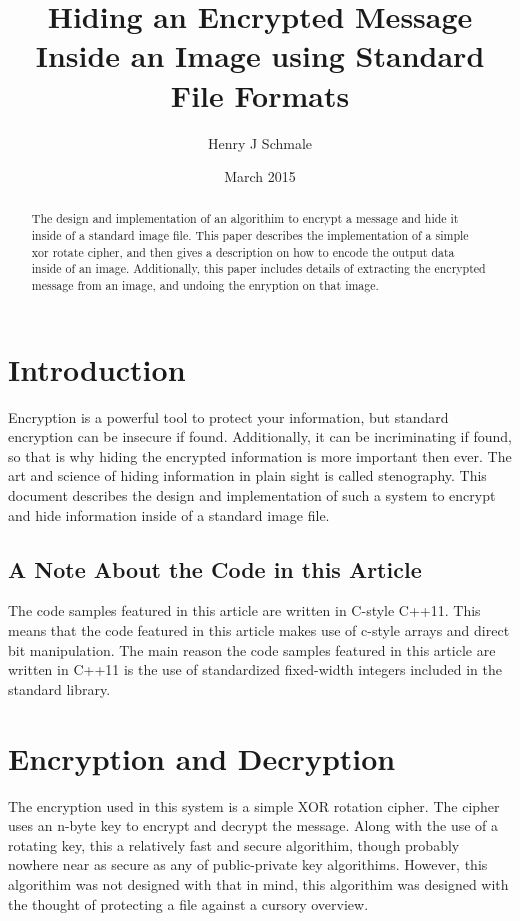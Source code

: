 \documentclass[12pt]{article}
\begin{document}
\title{Hiding an Encrypted Message Inside an Image using
      Standard File Formats}
\author{Henry J Schmale}
\date{March 2015}
\maketitle

\begin{abstract}
  The design and implementation of an algorithim to encrypt a message
  and hide it inside of a standard image file. This paper describes
  the implementation of a simple xor rotate cipher, and then gives
  a description on how to encode the output data inside of an image.
  Additionally, this paper includes details of extracting the
  encrypted message from an image, and undoing the enryption on that
  image.
\end{abstract}

\newpage
\tableofcontents                       %
\newpage

\section{Introduction}
  Encryption is a powerful tool to protect your information, but standard
  encryption can be insecure if found. Additionally, it can be incriminating
  if found, so that is why hiding the encrypted information is more important
  then ever. The art and science of hiding information in plain sight is 
  called stenography. This document describes the design and implementation
  of such a system to encrypt and hide information inside of a standard 
  image file.

  \subsection{A Note About the Code in this Article}
    The code samples featured in this article are written in C-style C++11.
    This means that the code featured in this article makes use of c-style
    arrays and direct bit manipulation. The main reason the code samples
    featured in this article are written in C++11 is the use of standardized 
    fixed-width integers included in the standard library.

\section{Encryption and Decryption}
  The encryption used in this system is a simple XOR rotation cipher.
  The cipher uses an n-byte key to encrypt and decrypt the message.
  Along with the use of a rotating key, this a relatively fast and
  secure algorithim, though probably nowhere near as secure as any of
  public-private key algorithims. However, this algorithim was not
  designed with that in mind, this algorithim was designed with the
  thought of protecting a file against a cursory overview.
  
\end{document}
